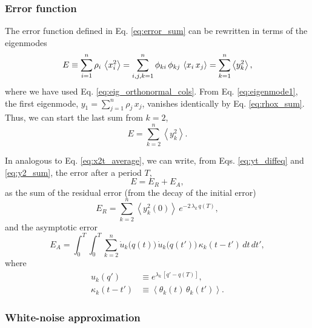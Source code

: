 \documentclass[reprint, floatfix]{revtex4-1}
\newcommand{\Err}{E}
\begin{document}
\subsubsection{Error function}



The error function defined in Eq. \eqref{eq:error_sum}
can be rewritten in terms of the eigenmodes
\begin{align}
  \Err
  \equiv
  \sum_{i = 1}^n \rho_i \,
    \left\langle x_i^2 \right\rangle
  =
  \sum_{i, j, k=1}^n \phi_{ki} \, \phi_{kj} \,
    \left\langle x_i \, x_j \right\rangle
  =
  \sum_{k = 1}^n
    \left\langle
      y_k^2
    \right\rangle
  ,
\notag
\end{align}
%
where we have used Eq. \eqref{eq:eig_orthonormal_cols}.
%
From Eq. \eqref{eq:eigenmode1},
the first eigenmode,
$y_1 = \sum_{j=1}^n \rho_j \, x_j$,
vanishes identically by Eq. \eqref{eq:rhox_sum}.
%
Thus, we can start the last sum %
from $k = 2$,
\begin{equation}
  \Err
  =
  \sum_{k = 2}^n
    \left\langle
      y_k^2
    \right\rangle
  .
\label{eq:y2_sum}
\end{equation}

In analogous to Eq. \eqref{eq:x2t_average},
we can write,
from Eqs. \eqref{eq:yt_diffeq} and \eqref{eq:y2_sum},
the error after a period $T$,
%
\begin{equation}
  \Err
  =
  \Err_R + \Err_A,
  \label{eq:error_split}
\end{equation}
%
as the sum of the residual error
(from the decay of the initial error)
%
\begin{equation}
  \Err_R
  =
  \sum_{k = 2}^n
    \left\langle y_k^2(0) \right\rangle \,
    e^{ - 2 \, \lambda_k  \, q(T) },
  \label{eq:error_res}
\end{equation}
%
and the asymptotic error
\begin{equation}
  \Err_A
  =
  \int_0^T \int_0^T
  \sum_{k = 2}^n
    \dot u_k\bigl( q(t) \bigr) \,
    \dot u_k\bigl( q(t') \bigr) \,
    \kappa_k(t - t') \, dt \, dt',
  \label{eq:error_asym}
\end{equation}
%
where
\begin{align*}
  u_k(q')
  &\equiv
  e^{\lambda_k \, [q' - q(T)]},
  \\
  \kappa_k(t - t')
  &\equiv
  \left\langle
    \theta_k(t) \, \theta_k(t')
  \right\rangle.
\end{align*}



\subsubsection{White-noise approximation}
\end{document}
